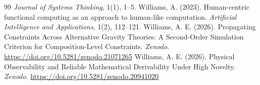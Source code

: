 \documentclass[11pt]{article}
\theoremstyle{definition}
\begin{document}
\begin{thebibliography}{99}
\textit{Journal of Systems Thinking}, 1(1), 1--5.
Williams, A. (2023). 
Human-centric functional computing as an approach to human-like computation. 
\textit{Artificial Intelligence and Applications}, 1(2), 112--121.
Williams, A. E. (2026). 
Propagating Constraints Across Alternative Gravity Theories: A Second-Order Simulation Criterion for Composition-Level Constraints. 
\textit{Zenodo}. \url{https://doi.org/10.5281/zenodo.21071265}
Williams, A. E. (2026). 
Physical Observability and Reliable Mathematical Derivability Under High Novelty. 
\textit{Zenodo}. \url{https://doi.org/10.5281/zenodo.20941020}
\end{thebibliography}
\end{document}
